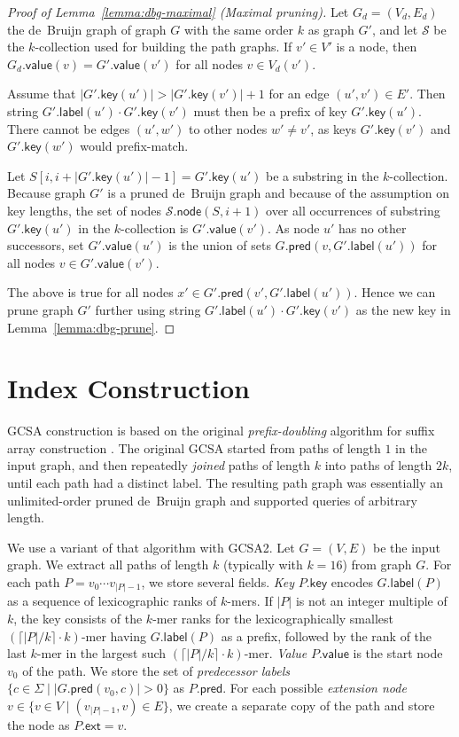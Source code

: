 \documentclass[a4paper,UKenglish]{lipics-v2016}
\newcommand{\set}[1]{\ensuremath{\{ #1 \}}}
\newcommand{\abs}[1]{\ensuremath{\lvert #1 \rvert}}
\newcommand{\glabel}{\ensuremath{\mathsf{label}}}
\newcommand{\gpred}{\ensuremath{\mathsf{pred}}}
\newcommand{\gkey}{\ensuremath{\mathsf{key}}}
\newcommand{\gvalue}{\ensuremath{\mathsf{value}}}
\newcommand{\gnode}{\ensuremath{\mathsf{node}}}
\newcommand{\gext}{\ensuremath{\mathsf{ext}}}
\newcommand{\kmer}[1]{$#1$\nobreakdash-mer}
\newcommand{\kcollection}[1]{$#1$\nobreakdash-collection}
\begin{document}
\begin{proof}[Proof of Lemma~\ref{lemma:dbg-maximal} (Maximal pruning)]
Let $G_{d} = (V_{d}, E_{d})$ the de~Bruijn graph of graph $G$ with the same order $k$ as graph $G'$, and let $\mathcal{S}$ be the \kcollection{k} used for building the path graphs. If $v' \in V'$ is a node, then $G_{d}.\gvalue(v) = G'.\gvalue(v')$ for all nodes $v \in V_{d}(v')$.

Assume that $\abs{G'.\gkey(u')} > \abs{G'.\gkey(v')}+1$ for an edge $(u', v') \in E'$. Then string $G'.\glabel(u') \cdot G'.\gkey(v')$ must then be a prefix of key $G'.\gkey(u')$. There cannot be edges $(u', w')$ to other nodes $w' \ne v'$, as keys $G'.\gkey(v')$ and $G'.\gkey(w')$ would prefix-match.

Let $S[i, i+\abs{G'.\gkey(u')}-1] = G'.\gkey(u')$ be a substring in the \kcollection{k}. Because graph $G'$ is a pruned de~Bruijn graph and because of the assumption on key lengths, the set of nodes $\mathcal{S}.\gnode(S, i+1)$ over all occurrences of substring $G'.\gkey(u')$ in the \kcollection{k} is $G'.\gvalue(v')$. As node $u'$ has no other successors, set $G'.\gvalue(u')$ is the union of sets $G.\gpred(v, G'.\glabel(u'))$ for all nodes $v \in G'.\gvalue(v')$.

The above is true for all nodes $x' \in G'.\gpred(v', G'.\glabel(u'))$. Hence we can prune graph $G'$ further using string $G'.\glabel(u') \cdot G'.\gkey(v')$ as the new key in Lemma~\ref{lemma:dbg-prune}.
\end{proof}


\section{Index Construction}\label{appendix:construction}

GCSA construction \cite{Siren2014} is based on the original \emph{prefix-doubling} algorithm for suffix array construction \cite{Manber1993}. The original GCSA started from paths of length $1$ in the input graph, and then repeatedly \emph{joined} paths of length $k$ into paths of length $2k$, until each path had a distinct label. The resulting path graph was essentially an unlimited-order pruned de~Bruijn graph and supported queries of arbitrary length.

We use a variant of that algorithm with GCSA2. Let $G = (V, E)$ be the input graph. We extract all paths of length $k$ (typically with $k = 16$) from graph $G$. For each path $P = v_{0} \dotsm v_{\abs{P}-1}$, we store several fields. \emph{Key} $P.\gkey$ encodes $G.\glabel(P)$ as a sequence of lexicographic ranks of \kmer{k}s. If $\abs{P}$ is not an integer multiple of $k$, the key consists of the \kmer{k} ranks for the lexicographically smallest \kmer{(\lceil \abs{P}/k \rceil \cdot k)} having $G.\glabel(P)$ as a prefix, followed by the rank of the last \kmer{k} in the largest such \kmer{(\lceil \abs{P}/k \rceil \cdot k)}. \emph{Value} $P.\gvalue$ is the start node $v_{0}$ of the path. We store the set of \emph{predecessor labels} $\set{c \in \Sigma \mid \abs{G.\gpred(v_{0}, c)} > 0}$ as $P.\gpred$. For each possible \emph{extension node} $v \in \set{v \in V \mid (v_{\abs{P}-1}, v) \in E}$, we create a separate copy of the path and store the node as $P.\gext = v$.
\end{document}

